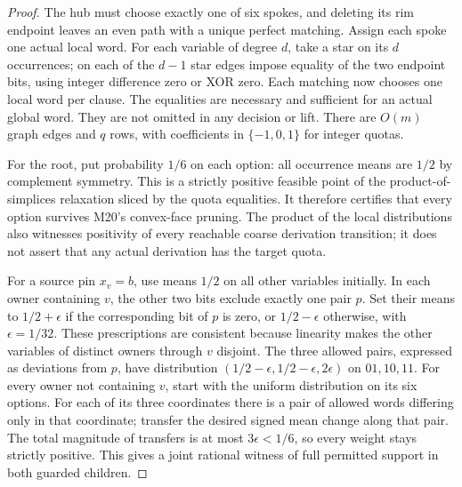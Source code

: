\documentclass[11pt]{article}
\begin{document}
\begin{proof}
The hub must choose exactly one of six spokes, and deleting its rim endpoint leaves an even path with a unique perfect matching. Assign each spoke one actual local word. For each variable of degree $d$, take a star on its $d$ occurrences; on each of the $d-1$ star edges impose equality of the two endpoint bits, using integer difference zero or XOR zero. Each matching now chooses one local word per clause. The equalities are necessary and sufficient for an actual global word. They are not omitted in any decision or lift. There are $O(m)$ graph edges and $q$ rows, with coefficients in $\{-1,0,1\}$ for integer quotas.

For the root, put probability $1/6$ on each option: all occurrence means are $1/2$ by complement symmetry. This is a strictly positive feasible point of the product-of-simplices relaxation sliced by the quota equalities. It therefore certifies that every option survives M20's convex-face pruning. The product of the local distributions also witnesses positivity of every reachable coarse derivation transition; it does not assert that any actual derivation has the target quota.

For a source pin $x_v=b$, use means $1/2$ on all other variables initially. In each owner containing $v$, the other two bits exclude exactly one pair $p$. Set their means to $1/2+\epsilon$ if the corresponding bit of $p$ is zero, or $1/2-\epsilon$ otherwise, with $\epsilon=1/32$. These prescriptions are consistent because linearity makes the other variables of distinct owners through $v$ disjoint. The three allowed pairs, expressed as deviations from $p$, have distribution $(1/2-\epsilon,1/2-\epsilon,2\epsilon)$ on $01,10,11$. For every owner not containing $v$, start with the uniform distribution on its six options. For each of its three coordinates there is a pair of allowed words differing only in that coordinate; transfer the desired signed mean change along that pair. The total magnitude of transfers is at most $3\epsilon<1/6$, so every weight stays strictly positive. This gives a joint rational witness of full permitted support in both guarded children.


\end{proof}
\end{document}
